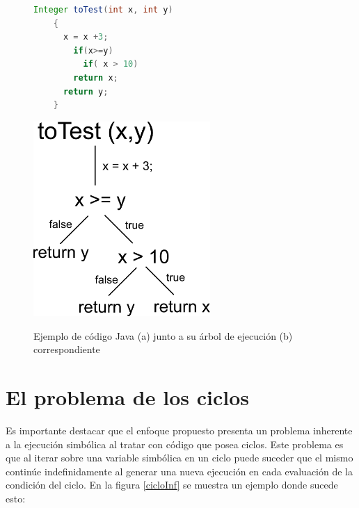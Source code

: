 \documentclass{llncs}
\begin{document}
\begin{figure}[hbt!]
  \centering
    \begin{minipage}[b]{0.5\textwidth}
      \begin{lstlisting}[language=Java]
	Integer toTest(int x, int y)
	{
	  x = x +3;
	    if(x>=y) 
	      if( x > 10) 
		return x;
	  return y;
	}
      \end{lstlisting}
    \end{minipage}
  \begin{minipage}[b]{0.45\textwidth}
    \centering
    \includegraphics[width=0.6\textwidth]{arbolEjecucion}\\
  \end{minipage}
  \caption{Ejemplo de código Java (a) junto a su árbol de ejecución (b) correspondiente}
  \label{arbolEjecucion}
\end{figure}


\section{El problema de los ciclos}\label{sec:loopProblem}
Es importante destacar que el enfoque propuesto presenta un problema inherente a la ejecución simbólica al tratar con código que posea ciclos.
Este problema es que al iterar sobre una variable simbólica en un ciclo puede suceder que el mismo continúe indefinidamente al generar una nueva
ejecución en cada e\-va\-lua\-ción de la condición del ciclo. En la figura \ref{cicloInf} se muestra un ejemplo donde sucede esto:
\end{document}
